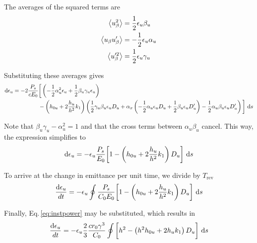 The averages of the squared terms are
\begin{align}
    \left\langle {u_\beta^2} \right\rangle        &=   \frac{1}{2} \epsilon_u \beta_u\\
    \left\langle {u_\beta u_\beta'} \right\rangle &= - \frac{1}{2} \epsilon_u \alpha_u\\
    \left\langle {u_\beta'^2} \right\rangle       &=   \frac{1}{2} \epsilon_u \gamma_u
\end{align}

Substituting these averages gives
\begin{align}
    \text{d} \epsilon_u = - 2 \frac{P_s}{cE_0} &\bigg[ \left( - \frac{1}{2} \alpha_u^2 \epsilon_u + \frac{1}{2} \beta_u \gamma_u \epsilon_u \right) \notag \\
    &- \left( h_{0u} + 2 \frac{h_u}{h^2} k_1 \right) \left( \frac{1}{2} \gamma_u \beta_u \epsilon_u D_u  + \alpha_x \left(-\frac{1}{2} \alpha_u \epsilon_u D_u + \frac{1}{2} \beta_u \epsilon_u D_u' \right) - \frac{1}{2} \alpha_u \beta_u \epsilon_u D_u' \right) \bigg]\ \text{d} s
\end{align}

Note that $\beta_u \gamma_u - \alpha_u^2 = 1$ and that the cross terms between $\alpha_u\beta_u$ cancel. This way, the expression simplifies to
\begin{align}
    \text{d} \epsilon_u = - \epsilon_u \frac{P_s}{E_0} \bigg[ 1 - \left( h_{0u} + 2 \frac{h_u}{h^2} k_1 \right) D_u \bigg]\ \text{d} s
\end{align}

To arrive at the change in emittance per unit time, we divide by $T_\text{rev}$
%
%
\begin{equation}
    \frac{\text{d} \epsilon_u}{dt} = - \epsilon_u \oint \frac{P_s}{C_0 E_0} \bigg[ 1 - \left( h_{0u} + 2 \frac{h_u}{h^2} k_1 \right) D_u \bigg]\ \text{d} s
\end{equation}

Finally, Eq.\,\ref{eq:instpower} may be substituted, which results in
\begin{equation}
    \frac{\text{d} \epsilon_u}{dt} = - \epsilon_u \frac{2}{3} \frac{c r_0 \gamma^3}{C_0} \oint \bigg[ h^2 - \left( h^2 h_{0u} + 2 h_u k_1 \right) D_u \bigg]\ \text{d} s
\end{equation}

